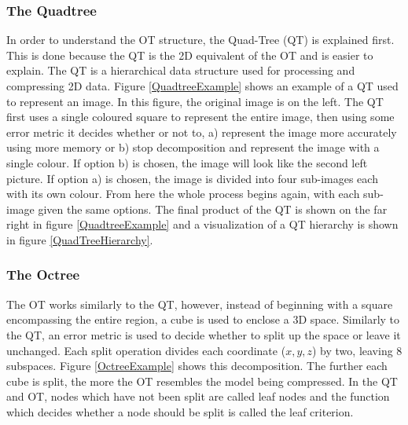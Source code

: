 \subsubsection{The Quadtree}

In order to understand the OT structure, the Quad-Tree (QT) is explained first. This is done because the QT is the 2D equivalent of the OT and is easier to explain. The QT is a hierarchical data structure used for processing and compressing 2D data. Figure \ref{QuadtreeExample} shows an example of a QT used to represent an image. In this figure, the original image is on the left. The QT first uses a single coloured square to represent the entire image, then using some error metric it decides whether or not to, a) represent the image more accurately using more memory or b) stop decomposition and represent the image with a single colour. If option b) is chosen, the image will look like the second left picture. If option a) is chosen, the image is divided into four sub-images each with its own colour. From here the whole process begins again, with each sub-image given the same options. The final product of the QT is shown on the far right in figure \ref{QuadtreeExample} and a visualization of a QT hierarchy is shown in figure \ref{QuadTreeHierarchy}.

\subsubsection{The Octree}

The OT works similarly to the QT, however, instead of beginning with a square encompassing the entire region, a cube is used to enclose a 3D space. Similarly to the QT, an error metric is used to decide whether to split up the space or leave it unchanged. Each split operation divides each coordinate ($x,y,z$) by two, leaving 8 subspaces. Figure \ref{OctreeExample} shows this decomposition. The further each cube is split, the more the OT resembles the model being compressed. In the QT and OT, nodes which have not been split are called leaf nodes and the function which decides whether a node should be split is called the leaf criterion. 

